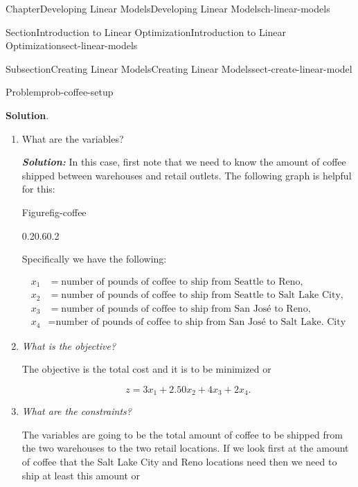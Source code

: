 \documentclass[oneside,10pt,]{book}
\newcommand{\blocktitlefont}{\relax}
\newcommand{\alert}[1]{\textbf{\textit{#1}}}
\numberwithin{equation}{section}
\newcommand{\amp}{&}
\begin{document}
\begin{chapterptx}{Chapter}{Developing Linear Models}{}{Developing Linear Models}{}{}{ch-linear-models}
\begin{sectionptx}{Section}{Introduction to Linear Optimization}{}{Introduction to Linear Optimization}{}{}{sect-linear-models}
\begin{subsectionptx}{Subsection}{Creating Linear Models}{}{Creating Linear Models}{}{}{sect-create-linear-model}
\begin{problem}{Problem}{}{prob-coffee-setup}
\par\smallskip%
\noindent\textbf{\blocktitlefont Solution}.\hypertarget{prob-coffee-setup-2}{}\quad{}%
\begin{enumerate}
\item{}What are the variables?%
\par
\alert{Solution:} In this case, first note that we need to know the amount of coffee shipped between warehouses and retail outlets. The following graph is helpful for this:%
\begin{figureptx}{Figure}{}{fig-coffee}{}%
\begin{image}{0.2}{0.6}{0.2}{}%
%
\end{image}%
\tcblower
\end{figureptx}%
Specifically we have the following:%
\par
%
\begin{align*}
x_1 \amp = \text{number of pounds of coffee to ship from Seattle to Reno},\\
x_2 \amp = \text{number of pounds of coffee to ship from Seattle to Salt Lake City},\\
x_3 \amp = \text{number of pounds of coffee to ship from San José  to Reno},\\
x_4 \amp = \text{number of pounds of coffee to ship from San José to Salt Lake. City}
\end{align*}
%
\item{}\emph{What is the objective?}%
\par
The objective is the total cost and it is to be minimized or%
\par
%
\begin{equation*}
z = 3 x_1 + 2.50 x_2 + 4 x_3 + 2 x_4.
\end{equation*}
%
\item{}\emph{What are the constraints?}%
\par
The variables are going to be the total amount of coffee to be shipped from the two warehouses to the two retail locations. If we look first at the amount of coffee that the Salt Lake City and Reno locations need then we need to ship at least this amount or%

\end{enumerate}
\end{problem}
\end{subsectionptx}
\end{sectionptx}
\end{chapterptx}
\end{document}
